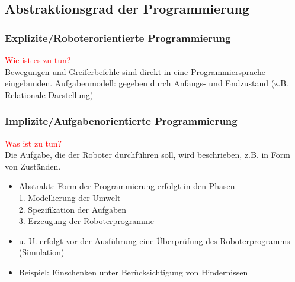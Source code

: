 \subsection{Abstraktionsgrad der Programmierung}
\subsubsection{Explizite/Roboterorientierte Programmierung}
\textcolor{red}{\glqq Wie ist es zu tun?\grqq} \\
Bewegungen und Greiferbefehle sind direkt in eine Programmiersprache eingebunden.
Aufgabenmodell: gegeben durch Anfangs- und Endzustand (z.B. Relationale Darstellung)
\subsubsection{Implizite/Aufgabenorientierte Programmierung}
\textcolor{red}{\glqq Was ist zu tun?\grqq} \\
Die Aufgabe, die der Roboter durchführen soll, wird beschrieben, z.B. in Form von Zuständen.
\begin{itemize}
\item Abstrakte Form der Programmierung erfolgt in den Phasen\\
1. Modellierung der Umwelt\\
2. Spezifikation der Aufgaben\\
3. Erzeugung der Roboterprogramme
\item u. U. erfolgt vor der Ausführung eine Überprüfung des
Roboterprogramms (Simulation)
\item Beispiel: Einschenken unter Berücksichtigung von Hindernissen
\end{itemize}